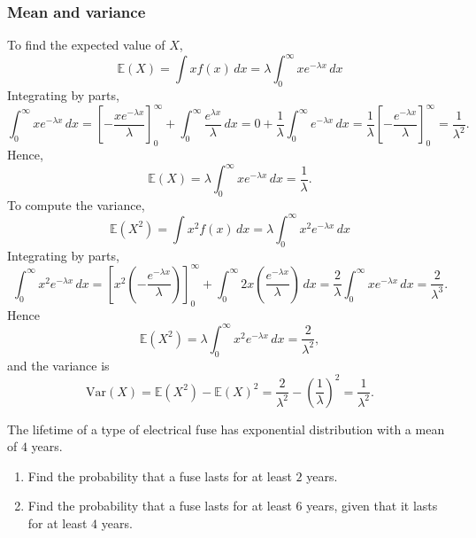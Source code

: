 \documentclass[lecture]{csm}
\newcommand{\expe}{\mathbb{E}}
\newcommand{\var}{\text{Var}}
\def\it{\item}
\def\ben{\begin{enumerate}}
\def\een{\end{enumerate}}
\begin{document}
\subsubsection*{Mean and variance}
To find the expected value of $X$,
\[
\expe(X) = \int xf(x)\,dx = \lambda\int_0^{\infty} xe^{-\lambda x}\,dx
\]
Integrating by parts,
\begin{equation*}\label{eq:expe_expo}
\int_0^{\infty} xe^{-\lambda x}\,dx
	= \left[-\frac{xe^{-\lambda x}}{\lambda}\right]_0^{\infty} + \int_0^{\infty} \frac{e^{\lambda x}}{\lambda}\,dx
	= 0 + \frac{1}{\lambda}\int_0^{\infty} e^{-\lambda x}\,dx
	= \frac{1}{\lambda}\left[-\frac{e^{-\lambda x}}{\lambda}\right]_0^{\infty}
	= \frac{1}{\lambda^2}.%
\end{equation*}
Hence, 
\[
\expe(X) = \lambda\int_0^{\infty} xe^{-\lambda x}\,dx = \frac{1}{\lambda}.
\]
To compute the variance, 
\[
\expe(X^2) = \int x^2 f(x)\,dx = \lambda\int_0^{\infty} x^2 e^{-\lambda x}\,dx
\]
Integrating by parts,
\[
\int_0^{\infty} x^2 e^{-\lambda x}\,dx
	= \left[x^2\left(-\frac{e^{-\lambda x}}{\lambda}\right)\right]_0^{\infty} + \int_0^\infty 2x\left(\frac{e^{-\lambda x}}{\lambda}\right)\,dx 
	= \frac{2}{\lambda}\int_0^{\infty} xe^{-\lambda x}\,dx 
	= \frac{2}{\lambda^3}.%
\]
Hence 
\[
\expe(X^2) = \lambda\int_0^{\infty} x^2 e^{-\lambda x}\,dx = \frac{2}{\lambda^2},
\]
and the variance is 
\[
\var(X) = \expe(X^2) - \expe(X)^2 = \frac{2}{\lambda^2} - \left(\frac{1}{\lambda}\right)^2 = \frac{1}{\lambda^2}.
\]


\newpage

\begin{example}
The lifetime of a type of electrical fuse has exponential distribution with a mean of $4$ years. 
\ben
\it Find the probability that a fuse lasts for at least $2$ years.
\it Find the probability that a fuse lasts for at least $6$ years, given that it lasts for at least $4$ years.
\een
\end{example}
\end{document}
